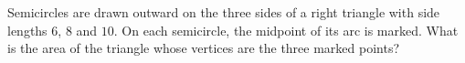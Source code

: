 Semicircles are drawn outward on the three sides of a right triangle with side lengths $6$, $8$ and $10$. On each semicircle, the midpoint of its arc is marked. What is the area of the triangle whose vertices are the three marked points?
